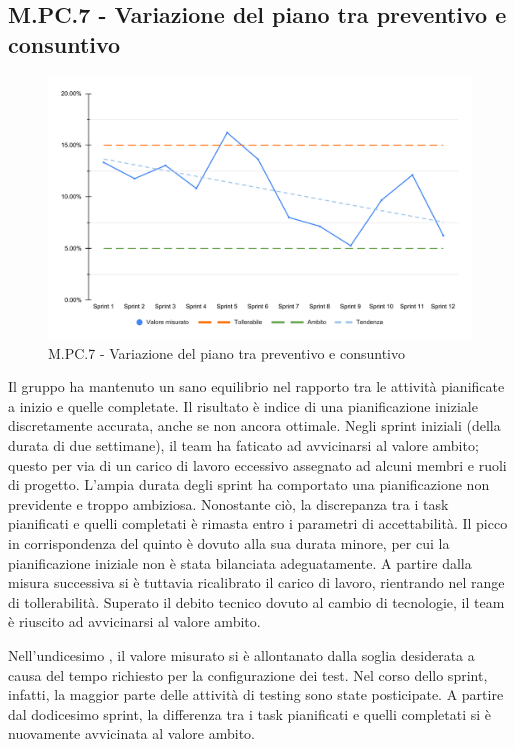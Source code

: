 \subsection{M.PC.7 - Variazione del piano tra preventivo e consuntivo}
\begin{figure}[H]
    \centering
    \includegraphics[width=\textwidth]{assets/variazione_task_completati.pdf}
    \caption{M.PC.7 - Variazione del piano tra preventivo e consuntivo}
\end{figure}

\par Il gruppo ha mantenuto un sano equilibrio nel rapporto tra le attività pianificate a inizio  e quelle completate. Il risultato è indice di una pianificazione iniziale discretamente accurata, anche se non ancora ottimale. Negli sprint iniziali (della durata di due settimane), il team ha faticato ad avvicinarsi al valore ambito; questo per via di un carico di lavoro eccessivo assegnato ad alcuni membri e ruoli di progetto. L’ampia durata degli sprint ha comportato una pianificazione non previdente e troppo ambiziosa. Nonostante ciò, la discrepanza tra i task pianificati e quelli completati è rimasta entro i parametri di accettabilità. Il picco in corrispondenza del quinto  è dovuto alla sua durata minore, per cui la pianificazione iniziale non è stata bilanciata adeguatamente. A partire dalla misura successiva si è tuttavia ricalibrato il carico di lavoro, rientrando nel range di tollerabilità. Superato il debito tecnico dovuto al cambio di tecnologie, il team è riuscito ad avvicinarsi al valore ambito.

\par Nell'undicesimo , il valore misurato si è allontanato dalla soglia desiderata a causa del tempo richiesto per la configurazione dei test. Nel corso dello sprint, infatti, la maggior parte delle attività di testing  sono state posticipate. A partire dal dodicesimo sprint, la differenza tra i task pianificati e quelli completati si è nuovamente avvicinata al valore ambito.
